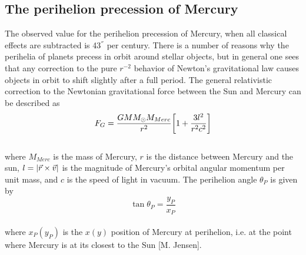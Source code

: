 \documentclass[%
reprint,nofootinbib,
amsmath,amssymb,
aps,
]{revtex4-1}
\begin{document}
\subsection{The perihelion precession of Mercury} \noindent 
The observed value for the perihelion precession of Mercury, when all classical effects are subtracted is 43$^{''}$ per century. There is a number of reasons why the perihelia of planets precess in orbit around stellar objects, but in general one sees that any correction to the pure $r^{-2}$ behavior of Newton's gravitational law causes objects in orbit to shift slightly after a full period. The general relativistic correction to the Newtonian gravitational force between the Sun and Mercury can be described as \vspace{3mm} \\
\begin{equation}
	F_G = \dfrac{GMM_{\odot}M_{Merc}}{r^2}\qty[1 + \dfrac{3l^2}{r^2c^2}]
\end{equation}  \vspace{3mm} \\
where $M_{Merc}$ is the mass of Mercury, $r$ is the distance between Mercury and the sun, $l = \abs{\vec{r}\times \vec{v}}$ is the magnitude of Mercury's orbital angular momentum per unit mass, and $c$ is the speed of light in vacuum. The perihelion angle $\theta_P$ is given by\\
\begin{equation}\label{per}
	\tan{\theta_P} = \dfrac{y_P}{x_P}
\end{equation} \\ 
where $x_P(y_P)$ is the $x(y)$ position of Mercury at perihelion, i.e. at the point where Mercury is at its closest to the Sun [M. Jensen].
\end{document}
